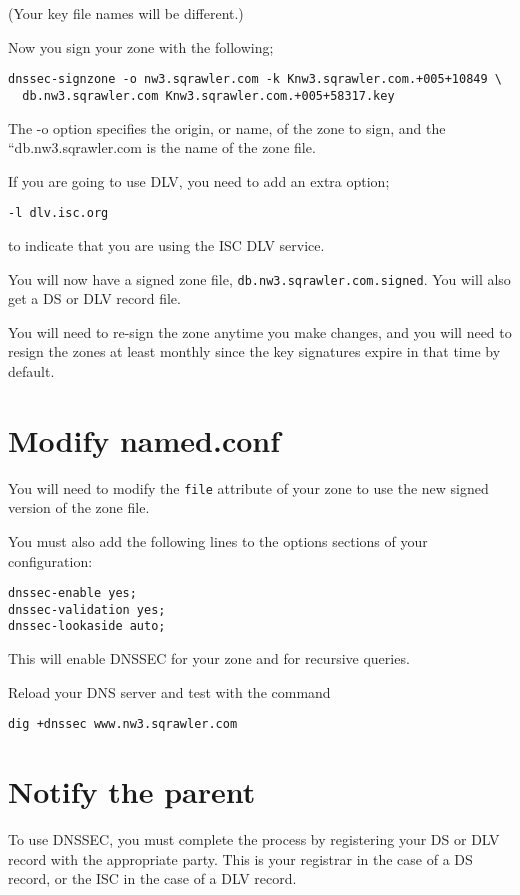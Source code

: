 \documentclass{article}
\begin{document}
(Your key file names will be different.)

Now you sign your zone with the following;
\begin{verbatim}
dnssec-signzone -o nw3.sqrawler.com -k Knw3.sqrawler.com.+005+10849 \
  db.nw3.sqrawler.com Knw3.sqrawler.com.+005+58317.key
\end{verbatim}

The -o option specifies the origin, or name, of the zone to sign, and the 
``db.nw3.sqrawler.com is the name of the zone file.

If you are going to use DLV, you need to add an extra option;

\texttt{-l dlv.isc.org}

to indicate that you are using the ISC DLV service.

You will now have a signed zone file, \texttt{db.nw3.sqrawler.com.signed}.  
You will also get a DS or DLV record file.  

You will need to re-sign the zone anytime you make changes, and you will need to resign the zones at least monthly since the key signatures expire in that time by default.

\section{Modify named.conf}

You will need to modify the \texttt{file} attribute of your zone to use the new signed version of the zone file.

You must also add the following lines to the options sections of your configuration:

\begin{verbatim}
dnssec-enable yes;
dnssec-validation yes;
dnssec-lookaside auto;
\end{verbatim}

This will enable DNSSEC for your zone and for recursive queries.

Reload your DNS server and test with the command

\texttt{dig +dnssec www.nw3.sqrawler.com}


\section{Notify the parent}
To use DNSSEC, you must complete the process by registering your DS or DLV record with the appropriate party.  This is your registrar in the case of a DS record, or the ISC in the case of a DLV record.
\end{document}
